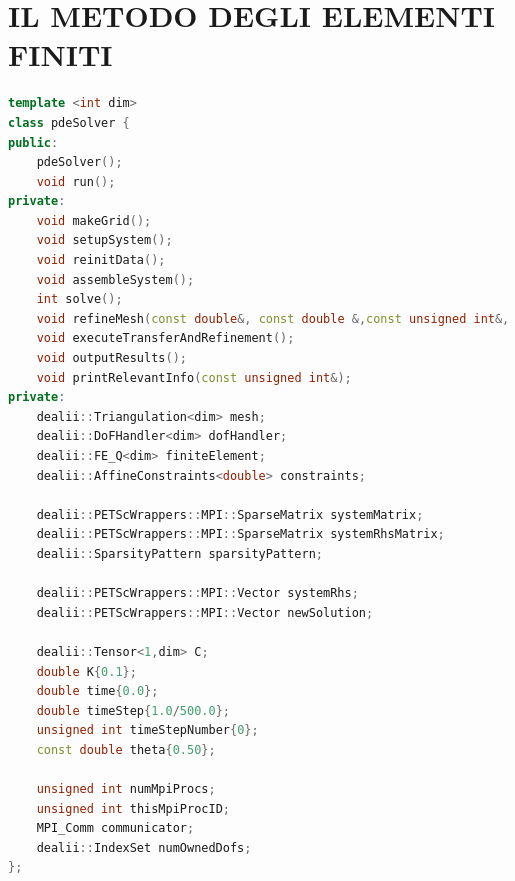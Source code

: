 \documentclass[italian]{article}
\begin{document}
 
\section{IL METODO DEGLI ELEMENTI FINITI}

\begin{lstlisting}[language=C++]
template <int dim>
class pdeSolver {
public:
    pdeSolver();
    void run();
private:
    void makeGrid();
    void setupSystem();
    void reinitData();
    void assembleSystem();
    int solve();
    void refineMesh(const double&, const double &,const unsigned int&, const unsigned int&);
    void executeTransferAndRefinement();
    void outputResults();
    void printRelevantInfo(const unsigned int&);
private:
    dealii::Triangulation<dim> mesh;
    dealii::DoFHandler<dim> dofHandler;
    dealii::FE_Q<dim> finiteElement;
    dealii::AffineConstraints<double> constraints;

    dealii::PETScWrappers::MPI::SparseMatrix systemMatrix;
    dealii::PETScWrappers::MPI::SparseMatrix systemRhsMatrix;
    dealii::SparsityPattern sparsityPattern;

    dealii::PETScWrappers::MPI::Vector systemRhs;
    dealii::PETScWrappers::MPI::Vector newSolution;

    dealii::Tensor<1,dim> C;
    double K{0.1};
    double time{0.0};
    double timeStep{1.0/500.0};
    unsigned int timeStepNumber{0};
    const double theta{0.50};

    unsigned int numMpiProcs;
    unsigned int thisMpiProcID;
    MPI_Comm communicator;
    dealii::IndexSet numOwnedDofs;
};
\end{lstlisting}
\end{document}
